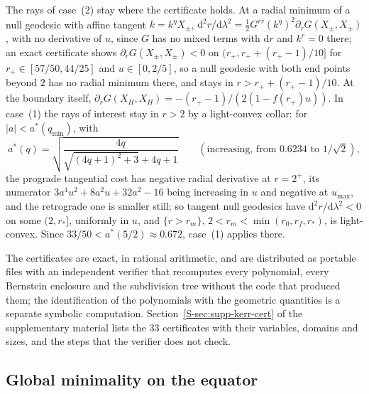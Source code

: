 \documentclass[aip,jmp,amsmath,amssymb,reprint]{revtex4-2}
\newcommand{\dd}{\mathrm{d}}
\theoremstyle{plain}
\theoremstyle{definition}
\begin{document}
The rays of case~(2) stay where the certificate holds. At a radial minimum of a null geodesic with
affine tangent $k=k^\eta X_\pm$, $\dd^2r/\dd\lambda^2=\frac12G^{rr}(k^\eta)^2\partial_rG(X_\pm,X_\pm)$, with no derivative of $u$,
since $G$ has no mixed terms with $\dd r$ and $k^r=0$ there; an exact certificate shows
$\partial_rG(X_\pm,X_\pm)<0$ on $(r_+,r_++(r_+-1)/10]$ for $r_+\in[57/50,44/25]$ and $u\in[0,2/5]$, so a null geodesic
with both end points beyond $2$ has no radial minimum there, and stays in $r>r_++(r_+-1)/10$. At the
boundary itself, $\partial_rG(X_H,X_H)=-(r_+-1)/(2(1-f(r_+)u))$. In case~(1) the rays of interest stay
in $r>2$ by a light-convex collar: for $|a|<a^*(q_{\min})$, with
\[
  a^*(q)=\sqrt{\frac{4q}{\sqrt{(4q+1)^2+3}+4q+1}}\qquad(\text{increasing, from }0.6234\text{ to }1/\sqrt2),
\]
the prograde tangential cost has negative radial derivative at $r=2^+$, its numerator
$3a^4u^2+8a^2u+32a^2-16$ being increasing in $u$ and negative at $u_{\max}$, and the retrograde one is
smaller still; so tangent null geodesics have $\dd^2r/\dd\lambda^2<0$ on some $(2,r_*]$, uniformly in $u$, and
$\{r>r_m\}$, $2<r_m<\min(r_0,r_f,r_*)$, is light-convex. Since $33/50<a^*(5/2)\approx0.672$, case~(1)
applies there.

The certificates are exact, in rational arithmetic, and are distributed as portable files with
an independent verifier that recomputes every polynomial, every Bernstein enclosure and the
subdivision tree without the code that produced them; the identification of the polynomials
with the geometric quantities is a separate symbolic computation. Section~\ref{S-sec:supp-kerr-cert} of the
supplementary material lists the $33$ certificates with their variables, domains and sizes, and the steps
that the verifier does not check.

\subsection{Global minimality on the equator}
\end{document}
